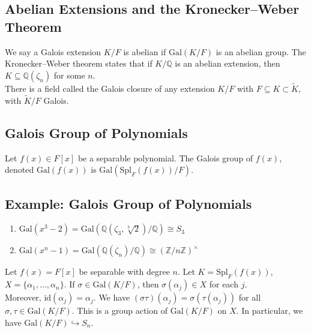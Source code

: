 \documentclass[10pt]{extarticle}
\newcommand{\Q}{\mathbb{Q}}
\newcommand{\Z}{\mathbb{Z}}
\begin{document}
  \subsection{Abelian Extensions and the Kronecker--Weber Theorem}%
  We say a Galois extension $K/F$ is abelian if $\text{Gal}(K/F)$ is an abelian group. The Kronecker--Weber theorem states that if $K/\Q$ is an abelian extension, then $K\subseteq \Q(\zeta_n)$ for some $n$.\\
  
  There is a field called the Galois closure of any extension $K/F$ with $F\subseteq K\subset \tilde{K}$, with $\tilde{K}/F$ Galois.
  \subsection{Galois Group of Polynomials}%
  Let $f(x)\in F[x]$ be a separable polynomial. The Galois group of $f(x)$, denoted $\text{Gal}(f(x))$ is $\text{Gal}\left(\text{Spl}_F(f(x))/F\right)$.
  \subsection{Example: Galois Group of Polynomials}%
  \begin{enumerate}[(1)]
    \item $\text{Gal}(x^3 - 2) = \text{Gal}\left(\Q(\zeta_3,\sqrt[3]{2})/\Q\right)\cong S_3$
    \item $\text{Gal}(x^n - 1) = \text{Gal}\left(\Q(\zeta_n)/\Q\right) \cong \left(\Z/n\Z\right)^{\times}$
  \end{enumerate}
  Let $f(x) = F[x]$ be separable with degree $n$. Let $K = \text{Spl}_{F}(f(x))$, $X = \{\alpha_1,\dots,\alpha_n\}$. If $\sigma\in \text{Gal}(K/F)$, then $\sigma(\alpha_j)\in X$ for each $j$.\\

  Moreover, $\text{id}(\alpha_j) = \alpha_j$. We have $(\sigma\tau)(\alpha_j) = \sigma(\tau(\alpha_j))$ for all $\sigma,\tau \in \text{Gal}(K/F)$. This is a group action of $\text{Gal}(K/F)$ on $X$. In particular, we have $\text{Gal}(K/F)\hookrightarrow S_n$.
\end{document}
